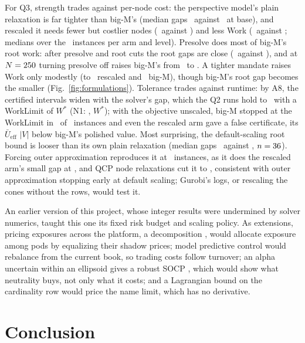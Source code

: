 \documentclass[conference]{IEEEtran}
\newcommand{\Ub}{\bar U}
\begin{document}
For Q3, strength trades against per-node cost: the perspective model's plain relaxation is far tighter than big-M's (median gaps \PlainPerspBase\ against \PlainBigMBase\ at base), and rescaled it needs fewer but costlier nodes (\NodesRescBase\ against \NodesBigMBase) and less Work (\WorkRescBase\ against \WorkBigMBase; medians over the \NOneCell\ instances per arm and level). Presolve does most of big-M's root work: after presolve and root cuts the root gaps are close (\RootRescBase\ against \RootBigMBase), and at $N=250$ turning presolve off raises big-M's from \PreBigMRootOn\ to \PreBigMRootOff. A tighter mandate raises Work only modestly (to \WorkRescTight\ rescaled and \WorkBigMTight\ big-M), though big-M's root gap becomes the smaller (Fig.~\ref{fig:formulations}). Tolerance trades against runtime: by A8, the certified intervals widen with the solver's gap, which the Q2 runs hold to \IOneMipGap\ with a WorkLimit of \IOneWorkFactor$W^*$ (N1: \NOneMipGap, $W^*$); with the objective unscaled, big-M stopped at the WorkLimit in \NTwoBigMWLOne\ of \NTwoArmN\ instances and even the rescaled arm gave a false certificate, its $\Ub_{\mathrm{eff}}$ \FalseCertGap$|V|$ below big-M's polished value. Most surprising, the default-scaling root bound is looser than its own plain relaxation (median gaps \NThreeGapDef\ against \NThreeGapPlain, $n=36$). Forcing outer approximation reproduces it at \NThreeEOneDef\ instances, as it does the rescaled arm's small gap at \NThreeEOneResc, and QCP node relaxations cut it to \NThreeGapMZero, consistent with outer approximation stopping early at default scaling; Gurobi's logs, or rescaling the cones without the rows, would test it.

An earlier version of this project, whose integer results were undermined by solver numerics, taught this one its fixed risk budget and scaling policy. As extensions, pricing exposures across the platform, a decomposition \cite{wolsey2020integer}, would allocate exposure among pods by equalizing their shadow prices; model predictive control would rebalance from the current book, so trading costs follow turnover; an alpha uncertain within an ellipsoid gives a robust SOCP \cite{boyd2004convex}, which would show what neutrality buys, not only what it costs; and a Lagrangian bound on the cardinality row \cite{wolsey2020integer} would price the name limit, which has no derivative.

\section{Conclusion}
\label{sec:conclusion}
\end{document}
